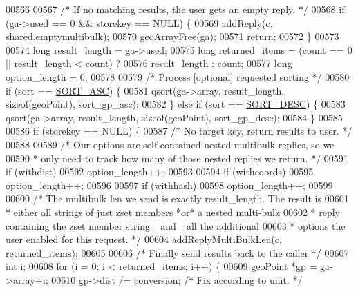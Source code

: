 \begin{DoxyCode}
{{{{{{{{{00566 
00567     \textcolor{comment}{/* If no matching results, the user gets an empty reply. */}
00568     \textcolor{keywordflow}{if} (ga->used == 0 && storekey == NULL) \{
00569         addReply(c, shared.emptymultibulk);
00570         geoArrayFree(ga);
00571         \textcolor{keywordflow}{return};
00572     \}
00573 
00574     \textcolor{keywordtype}{long} result\_length = ga->used;
00575     \textcolor{keywordtype}{long} returned\_items = (count == 0 || result\_length < count) ?
00576                           result\_length : count;
00577     \textcolor{keywordtype}{long} option\_length = 0;
00578 
00579     \textcolor{comment}{/* Process [optional] requested sorting */}
00580     \textcolor{keywordflow}{if} (sort == \hyperlink{geo_8c_a4cc2ef7982bc374e2ba1832ace8338b7}{SORT\_ASC}) \{
00581         qsort(ga->array, result\_length, \textcolor{keyword}{sizeof}(geoPoint), sort\_gp\_asc);
00582     \} \textcolor{keywordflow}{else} \textcolor{keywordflow}{if} (sort == \hyperlink{geo_8c_ad337a9ccff0b910f5a05d97cb5f3231e}{SORT\_DESC}) \{
00583         qsort(ga->array, result\_length, \textcolor{keyword}{sizeof}(geoPoint), sort\_gp\_desc);
00584     \}
00585 
00586     \textcolor{keywordflow}{if} (storekey == NULL) \{
00587         \textcolor{comment}{/* No target key, return results to user. */}
00588 
00589         \textcolor{comment}{/* Our options are self-contained nested multibulk replies, so we}
00590 \textcolor{comment}{         * only need to track how many of those nested replies we return. */}
00591         \textcolor{keywordflow}{if} (withdist)
00592             option\_length++;
00593 
00594         \textcolor{keywordflow}{if} (withcoords)
00595             option\_length++;
00596 
00597         \textcolor{keywordflow}{if} (withhash)
00598             option\_length++;
00599 
00600         \textcolor{comment}{/* The multibulk len we send is exactly result\_length. The result is}
00601 \textcolor{comment}{         * either all strings of just zset members  *or* a nested multi-bulk}
00602 \textcolor{comment}{         * reply containing the zset member string \_and\_ all the additional}
00603 \textcolor{comment}{         * options the user enabled for this request. */}
00604         addReplyMultiBulkLen(c, returned\_items);
00605 
00606         \textcolor{comment}{/* Finally send results back to the caller */}
00607         \textcolor{keywordtype}{int} i;
00608         \textcolor{keywordflow}{for} (i = 0; i < returned\_items; i++) \{
00609             geoPoint *gp = ga->array+i;
00610             gp->dist /= conversion; \textcolor{comment}{/* Fix according to unit. */}
}}}}}}}}}
\end{DoxyCode}

